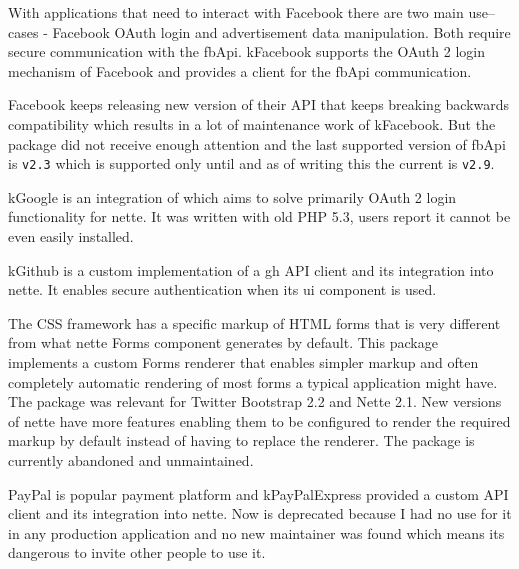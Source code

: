  \label{sec:state:facebook}

With applications that need to interact with Facebook there are two main use--cases - Facebook OAuth login and advertisement data manipulation. Both require secure communication with the \gls{fbApi}. \gls{kFacebook} supports the OAuth 2 login mechanism of Facebook and provides a client for the \gls{fbApi} communication.

Facebook keeps releasing new version of their API that keeps breaking backwards compatibility which results in a lot of maintenance work of \gls{kFacebook}. But the package did not receive enough attention and the last supported version of \gls{fbApi} is \lstinline{v2.3} which is supported only until  and as of writing this the current  is \lstinline{v2.9}.

 \label{sec:state:google}

\gls{kGoogle} is an integration of  which aims to solve primarily OAuth 2 login functionality for \gls{nette}. It was written with old PHP 5.3, users report it cannot be even easily installed.

 \label{sec:state:github}

\gls{kGithub} is a custom implementation of a \gls{gh} API client and its integration into \gls{nette}. It enables secure authentication when its \gls{ui} component is used.

 \label{sec:state:bootstrap-form-renderer}

The CSS framework  has a specific markup of HTML forms that is very different from what \gls{nette} Forms component generates by default. This package implements a custom Forms renderer that enables simpler markup and often completely automatic rendering of most forms a typical application might have. The package was relevant for Twitter Bootstrap 2.2 and Nette 2.1. New versions of \gls{nette} have more features enabling them to be configured to render the required markup by default instead of having to replace the renderer. The package is currently abandoned and unmaintained.

 \label{sec:state:paypal-express}

PayPal is popular payment platform and \gls{kPayPalExpress} provided a custom API client and its integration into \gls{nette}. Now is deprecated because I had no use for it in any production application and no new maintainer was found which means its dangerous to invite other people to use it.

